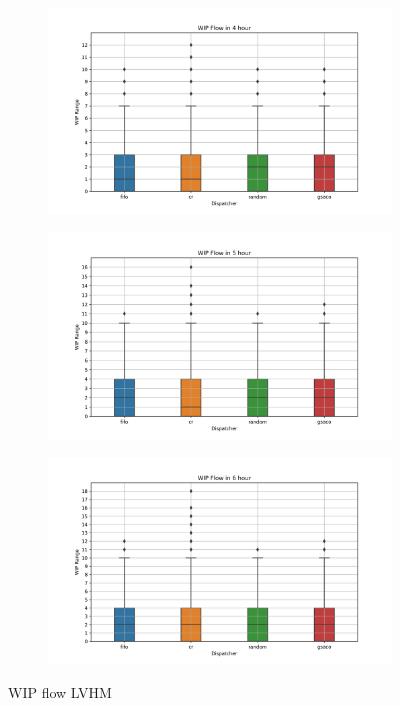 \begin{figure}[t]
\begin{subfigure}{0.32\textwidth}
		\caption{}
		\label{fig:p3}
	\end{subfigure}
	\begin{subfigure}{0.32\textwidth}
		\includegraphics[width=\textwidth]{LVHM/period_14400s.png}
		\caption{}
		\label{fig:p4}
	\end{subfigure}\hfill
	\begin{subfigure}{0.32\textwidth}
		\includegraphics[width=\textwidth]{LVHM/period_18000s.png}
		\caption{}
		\label{fig:p5}
	\end{subfigure}\hfill
	\begin{subfigure}{0.32\textwidth}
		\includegraphics[width=\textwidth]{LVHM/period_21600s.png}
		\caption{}
		\label{fig:p6}
	\end{subfigure}
    \caption{WIP flow LVHM}
    \label{fig:wip-flows-LVHM}
\end{figure}


